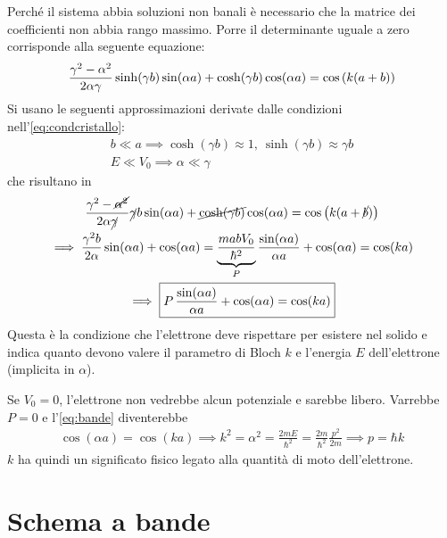 Perché il sistema abbia soluzioni non banali è necessario che la matrice dei coefficienti non abbia rango massimo.
Porre il determinante uguale a zero corrisponde alla seguente equazione:
\begin{equation}
    \frac{\gamma^2 - \alpha^2}{2 \alpha \gamma} \sinh(\gamma b) \sin(\alpha a) + \cosh(\gamma b) \cos(\alpha a) = \cos\pts{k(a + b)}
\end{equation}
Si usano le seguenti approssimazioni derivate dalle condizioni nell'\cref{eq:condcristallo}:
\begin{subequations}
    \begin{gather}
        b \ll a \implies \cosh(\gamma b) \approx 1, \ \sinh(\gamma b) \approx \gamma b \\
        E \ll V_0 \implies \alpha \ll \gamma
    \end{gather}
\end{subequations}
che risultano in
\begin{equation}
\label{eq:bande}
    \begin{gathered}
        \frac{\gamma^2 - \cancel{\alpha^2}}{2 \alpha \cancel{\gamma}} \cancel{\gamma} b \sin(\alpha a) + \cancel{\cosh(\gamma b)} \cos(\alpha a) = \cos\pts{k(a + \cancel{b})} \\
        \implies \frac{\gamma^2 b}{2 \alpha} \sin(\alpha a) + \cos(\alpha a) = \underbrace{\frac{m a b V_0}{\hbar^2}}_P \frac{\sin(\alpha a)}{\alpha a} + \cos(\alpha a) = \cos(ka) \\
        \implies
        \boxed{P \, \frac{\sin(\alpha a)}{\alpha a} + \cos(\alpha a) = \cos(ka)}
    \end{gathered}
\end{equation}
Questa è la condizione che l'elettrone deve rispettare per esistere nel solido e indica quanto devono valere il parametro di Bloch $k$ e l'energia $E$ dell'elettrone (implicita in $\alpha$).

Se $V_0 = 0$, l'elettrone non vedrebbe alcun potenziale e sarebbe libero.
Varrebbe $P = 0$ e l'\cref{eq:bande} diventerebbe
\begin{gather}
    \cos(\alpha a) = \cos(k a)
    \implies
    k^2 = \alpha^2 = \frac{2 m E}{\hbar^2} = \frac{2 m}{\hbar^2} \frac{p^2}{2 m}
    \implies
    p = \hbar k
\end{gather}
$k$ ha quindi un significato fisico legato alla quantità di moto dell'elettrone.

\section{Schema a bande}

